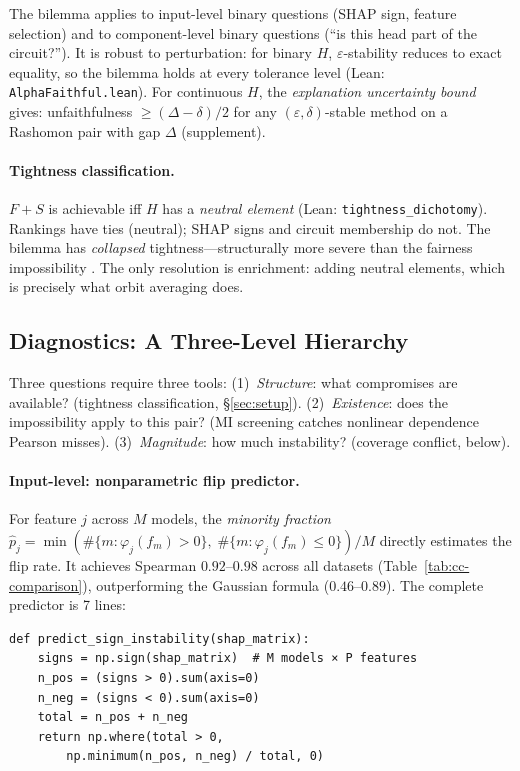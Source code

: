 \documentclass{article}
\begin{document}
The bilemma applies to input-level binary questions (SHAP sign, feature selection) and to component-level binary questions (``is this head part of the circuit?''). It is robust to perturbation: for binary $H$, $\varepsilon$-stability reduces to exact equality, so the bilemma holds at every tolerance level (Lean: \texttt{AlphaFaithful.lean}). For continuous $H$, the \emph{explanation uncertainty bound} gives: unfaithfulness $\geq (\Delta - \delta)/2$ for any $(\varepsilon,\delta)$-stable method on a Rashomon pair with gap $\Delta$ (supplement).

\paragraph{Tightness classification.}
$F{+}S$ is achievable iff $H$ has a \emph{neutral element} (Lean: \texttt{tightness\_dichotomy}). Rankings have ties (neutral); SHAP signs and circuit membership do not. The bilemma has \emph{collapsed} tightness---structurally more severe than the fairness impossibility \citep{chouldechova2017fair}. The only resolution is enrichment: adding neutral elements, which is precisely what orbit averaging does.

\subsection{Diagnostics: A Three-Level Hierarchy}

Three questions require three tools: (1)~\emph{Structure}: what compromises are available? (tightness classification, \S\ref{sec:setup}). (2)~\emph{Existence}: does the impossibility apply to this pair? (MI screening catches nonlinear dependence Pearson misses). (3)~\emph{Magnitude}: how much instability? (coverage conflict, below).

\paragraph{Input-level: nonparametric flip predictor.}
For feature $j$ across $M$ models, the \emph{minority fraction}
$\hat{p}_j = \min(\#\{m : \varphi_j(f_m) > 0\},\; \#\{m : \varphi_j(f_m) \leq 0\}) / M$
directly estimates the flip rate. It achieves Spearman $0.92$--$0.98$ across all datasets (Table~\ref{tab:cc-comparison}), outperforming the Gaussian formula ($0.46$--$0.89$). The complete predictor is 7 lines:

{\small
\begin{verbatim}
def predict_sign_instability(shap_matrix):
    signs = np.sign(shap_matrix)  # M models × P features
    n_pos = (signs > 0).sum(axis=0)
    n_neg = (signs < 0).sum(axis=0)
    total = n_pos + n_neg
    return np.where(total > 0,
        np.minimum(n_pos, n_neg) / total, 0)
\end{verbatim}
}
\end{document}
